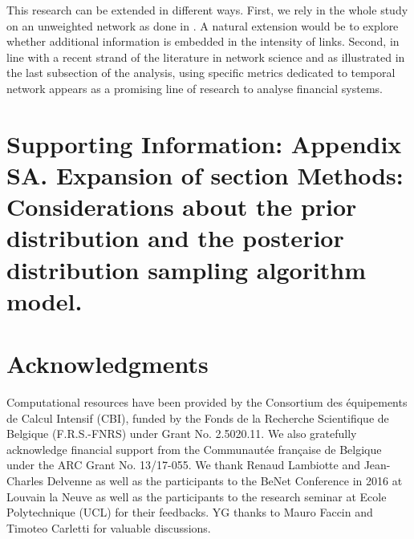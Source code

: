 \documentclass[a4paper,10pt]{article}
\begin{document}
 This research can be extended in different ways. First, we rely in the whole study on an unweighted network as done in \cite{Billio2}. A natural extension would be to explore whether additional information is embedded in the intensity of links. Second, in line with a recent strand of the literature in network science and as illustrated in the last subsection of the analysis, using specific metrics dedicated to temporal network appears as a promising line of research to analyse financial systems.   



\section*{Supporting Information: Appendix SA. Expansion of section Methods: Considerations about the prior distribution and the posterior distribution 
sampling algorithm model.} 

\section*{Acknowledgments}
Computational resources have been provided by the Consortium des \' equipements de Calcul Intensif (CBI), funded by the Fonds 
de la Recherche Scientifique de Belgique (F.R.S.-FNRS) under Grant No. 2.5020.11. We also gratefully acknowledge financial 
support from the Communaut\' ee fran\c caise de Belgique under the ARC Grant No. 13/17-055. We thank Renaud Lambiotte and 
Jean-Charles Delvenne as well as the participants to the BeNet Conference in 2016 at Louvain la Neuve as well as the participants to the 
research seminar at Ecole Polytechnique (UCL) for their feedbacks. YG thanks to Mauro Faccin and Timoteo Carletti for valuable discussions.
\end{document}
